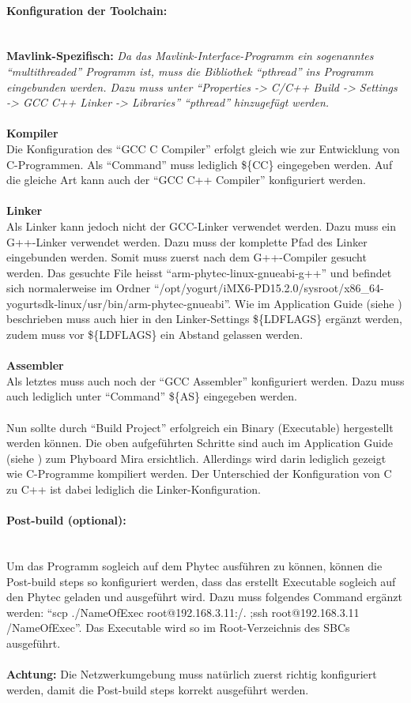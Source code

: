 \documentclass[12pt]{article} %
\begin{document}
	\paragraph*{Konfiguration der Toolchain:}\ \\[0.2cm]
	\noindent
	\textbf{Mavlink-Spezifisch:}\emph{
	Da das Mavlink-Interface-Programm ein sogenanntes "`multithreaded"' Programm ist, muss die Bibliothek "`pthread"' ins Programm eingebunden werden. Dazu muss unter "`Properties -> C/C++ Build -> Settings -> GCC C++ Linker -> Libraries"' "`pthread"' hinzugefügt werden.}\\
	\\
	\textbf{Kompiler}\\
	Die Konfiguration des "`GCC C Compiler"' erfolgt gleich wie zur Entwicklung von C-Programmen. Als "`Command"' muss lediglich \$\{CC\} eingegeben werden. Auf die gleiche Art kann auch der "`GCC C++ Compiler"' konfiguriert werden.\\
	\\
	\textbf{Linker}\\
	Als Linker kann jedoch nicht der GCC-Linker verwendet werden. Dazu muss ein G++-Linker verwendet werden. Dazu muss der komplette Pfad des Linker eingebunden werden. Somit muss zuerst nach dem G++-Compiler gesucht werden. Das gesuchte File heisst "`arm-phytec-linux-gnueabi-g++"' und befindet sich normalerweise im Ordner "`/opt/yogurt/iMX6-PD15.2.0/sysroot/x86\_64-yogurtsdk-linux/usr/bin/arm-phytec-gnueabi"'. Wie im Application Guide (siehe \cite{phytec}) beschrieben muss auch hier in den Linker-Settings \$\{LDFLAGS\} ergänzt werden, zudem muss vor \$\{LDFLAGS\} ein Abstand gelassen werden.\\
	\\
	\textbf{Assembler}\\
	Als letztes muss auch noch der "`GCC Assembler"' konfiguriert werden. Dazu muss auch lediglich unter "`Command"' \$\{AS\} eingegeben werden.\\
	\\
	Nun sollte durch "`Build Project"' erfolgreich ein Binary (Executable) hergestellt werden können. Die oben aufgeführten Schritte sind auch im Application Guide (siehe \cite{phytec}) zum Phyboard Mira ersichtlich. Allerdings wird darin lediglich gezeigt wie C-Programme kompiliert werden. Der Unterschied der Konfiguration von C zu C++ ist dabei lediglich die Linker-Konfiguration.
		
	\paragraph{Post-build (optional):}\ \\
	Um das Programm sogleich auf dem Phytec ausführen zu können, können die Post-build steps so konfiguriert werden, dass das erstellt Executable sogleich auf den Phytec geladen und ausgeführt wird. Dazu muss folgendes Command ergänzt werden: "`scp ./NameOfExec root@192.168.3.11:/. ;ssh root@192.168.3.11 /NameOfExec"'. Das Executable wird so im Root-Verzeichnis des SBCs ausgeführt.\\
	\\
	\textbf{Achtung:} Die Netzwerkumgebung muss natürlich zuerst richtig konfiguriert werden, damit die Post-build steps korrekt ausgeführt werden.
	
\end{document}
